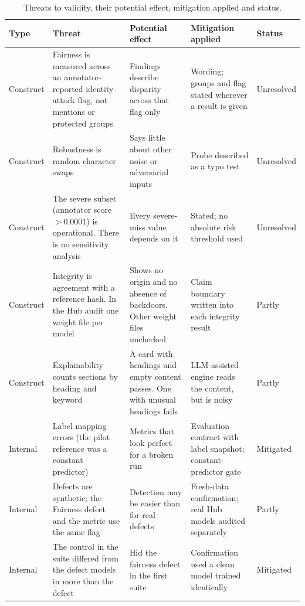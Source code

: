 \begin{table}[!htbp]
\centering\footnotesize\setlength{\tabcolsep}{3pt}
\caption{Threats to validity, their potential effect, mitigation applied and status.}\label{tab:threats}
\begin{tabularx}{\textwidth}{|>{\raggedright\arraybackslash}p{1.6cm}|>{\raggedright\arraybackslash}p{3.5cm}|>{\raggedright\arraybackslash}p{3.3cm}|>{\raggedright\arraybackslash}p{3.2cm}|>{\raggedright\arraybackslash}p{1.5cm}|}
\hline
\textbf{Type} & \textbf{Threat} & \textbf{Potential effect} & \textbf{Mitigation applied} & \textbf{Status}\\
\hline
Construct & Fairness is measured across an annotator-reported identity-attack flag, not mentions or protected groups & Findings describe disparity across that flag only & Wording; groups and flag stated wherever a result is given & Unresolved\\ \hline
Construct & Robustness is random character swaps & Says little about other noise or adversarial inputs & Probe described as a typo test & Unresolved\\ \hline
Construct & The severe subset (annotator score $>0.0001$) is operational. There is no sensitivity analysis & Every severe-miss value depends on it & Stated; no absolute risk threshold used & Unresolved\\ \hline
Construct & Integrity is agreement with a reference hash. In the Hub audit one weight file per model & Shows no origin and no absence of backdoors. Other weight files unchecked & Claim boundary written into each integrity result & Partly\\ \hline
Construct & Explainability counts sections by heading and keyword & A card with headings and empty content passes. One with unusual headings fails & LLM-assisted engine reads the content, but is noisy & Partly\\ \hline
Internal & Label mapping errors (the pilot reference was a constant predictor) & Metrics that look perfect for a broken run & Evaluation contract with label snapshot; constant-predictor gate & Mitigated\\ \hline
Internal & Defects are synthetic; the Fairness defect and the metric use the same flag & Detection may be easier than for real defects & Fresh-data confirmation; real Hub models audited separately & Partly\\ \hline
Internal & The control in the suite differed from the defect models in more than the defect & Hid the fairness defect in the first suite & Confirmation used a clean model trained identically & Mitigated\\ \hline

\end{tabularx}
\end{table}
